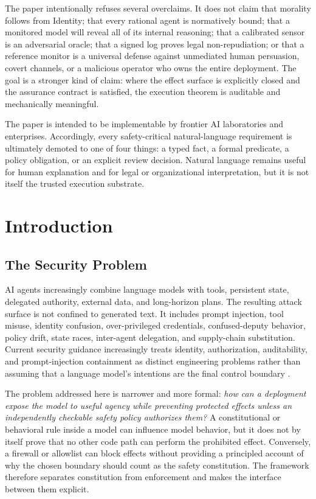 \documentclass[11pt]{article}
\begin{document}
The paper intentionally refuses several overclaims. It does not claim that morality follows from Identity; that every rational agent is normatively bound; that a monitored model will reveal all of its internal reasoning; that a calibrated sensor is an adversarial oracle; that a signed log proves legal non-repudiation; or that a reference monitor is a universal defense against unmediated human persuasion, covert channels, or a malicious operator who owns the entire deployment. The goal is a stronger kind of claim: where the effect surface is explicitly closed and the assurance contract is satisfied, the execution theorem is auditable and mechanically meaningful.

The paper is intended to be implementable by frontier AI laboratories and enterprises. Accordingly, every safety-critical natural-language requirement is ultimately demoted to one of four things: a typed fact, a formal predicate, a policy obligation, or an explicit review decision. Natural language remains useful for human explanation and for legal or organizational interpretation, but it is not itself the trusted execution substrate.

\clearpage

\section{Introduction}\label{sec:intro}
\subsection{The Security Problem}
AI agents increasingly combine language models with tools, persistent state, delegated authority, external data, and long-horizon plans. The resulting attack surface is not confined to generated text. It includes prompt injection, tool misuse, identity confusion, over-privileged credentials, confused-deputy behavior, policy drift, state races, inter-agent delegation, and supply-chain substitution. Current security guidance increasingly treats identity, authorization, auditability, and prompt-injection containment as distinct engineering problems rather than assuming that a language model's intentions are the final control boundary \cite{agentdojo,agentdyn,agentproxy,nist-agent-identity,owasp-agentic}.

The problem addressed here is narrower and more formal: \emph{how can a deployment expose the model to useful agency while preventing protected effects unless an independently checkable safety policy authorizes them?} A constitutional or behavioral rule inside a model can influence model behavior, but it does not by itself prove that no other code path can perform the prohibited effect. Conversely, a firewall or allowlist can block effects without providing a principled account of why the chosen boundary should count as the safety constitution. The framework therefore separates constitution from enforcement and makes the interface between them explicit.
\end{document}
